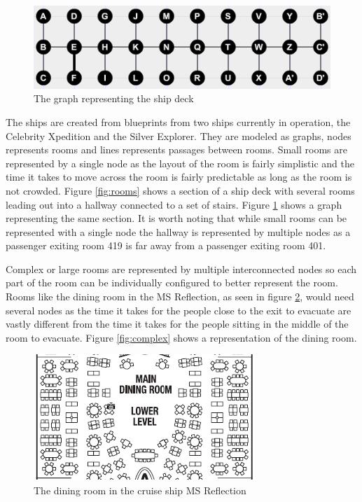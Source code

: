 \begin{figure} [h]
\centering
\includegraphics{images/simple.png}
\caption{The graph representing the ship deck}
\label{fig:simple}
\end{figure}

The ships are created from blueprints from two ships currently in operation, the Celebrity Xpedition and the Silver Explorer. They are modeled as graphs, nodes represents rooms and lines represents passages between rooms. Small rooms are represented by a single node as the layout of the room is fairly simplistic and the time it takes to move across the room is fairly predictable as long as the room is not crowded. Figure \ref{fig:rooms} shows a section of a ship deck with several rooms leading out into a hallway connected to a set of stairs. Figure \ref{fig:simple} shows a graph representing the same section. It is worth noting that while small rooms can be represented with a single node the hallway is represented by multiple nodes as a passenger exiting room 419 is far away from a passenger exiting room 401.

Complex or large rooms are represented by multiple interconnected nodes so each part of the room can be individually configured to better represent the room. Rooms like the dining room in the MS Reflection, as seen in figure \ref{fig:dining}, would need several nodes as the time it takes for the people close to the exit to evacuate are vastly different from the time it takes for the people sitting in the middle of the room to evacuate. Figure \ref{fig:complex} shows a representation of the dining room. 

\begin{figure} [h]
\centering
\includegraphics{images/Dining.png}
\caption{The dining room in the cruise ship MS Reflection}
\label{fig:dining}
\end{figure}

